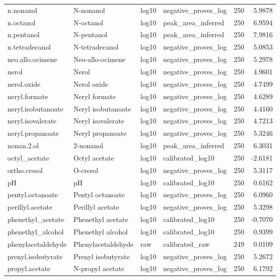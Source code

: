 {\begin{longtable}{llllrr}
n.nonanol & N-nonanol & log10 & negative\_proves\_log & 250 & 5.9878 \\
n.octanol & N-octanol & log10 & peak\_area\_inferred & 250 & 6.9594 \\
n.pentanol & N-pentanol & log10 & peak\_area\_inferred & 250 & 7.9816 \\
n.tetradecanol & N-tetradecanol & log10 & negative\_proves\_log & 250 & 5.0853 \\
neo.allo.ocimene & Neo-allo-ocimene & log10 & negative\_proves\_log & 250 & 5.2978 \\
nerol & Nerol & log10 & negative\_proves\_log & 250 & 4.9601 \\
nerol.oxide & Nerol oxide & log10 & negative\_proves\_log & 250 & 4.7499 \\
neryl.formate & Neryl formate & log10 & negative\_proves\_log & 250 & 4.6289 \\
neryl.isobutanoate & Neryl isobutanoate & log10 & negative\_proves\_log & 250 & 4.4160 \\
neryl.isovalerate & Neryl isovalerate & log10 & negative\_proves\_log & 250 & 4.7213 \\
neryl.propanoate & Neryl propanoate & log10 & negative\_proves\_log & 250 & 5.3246 \\
nonan.2.ol & 2-nonanol & log10 & peak\_area\_inferred & 250 & 6.3031 \\
octyl\_acetate & Octyl acetate & log10 & calibrated\_log10 & 250 & -2.6181 \\
ortho.cresol & O-cresol & log10 & negative\_proves\_log & 250 & 5.3117 \\
pH & pH & log10 & calibrated\_log10 & 250 & 0.6162 \\
pentyl.octanoate & Pentyl octanoate & log10 & negative\_proves\_log & 250 & 6.0960 \\
perillyl.acetate & Perillyl acetate & log10 & negative\_proves\_log & 250 & 5.3298 \\
phenethyl\_acetate & Phenethyl acetate & log10 & calibrated\_log10 & 250 & -0.7070 \\
phenethyl\_alcohol & Phenethyl alcohol & log10 & calibrated\_log10 & 250 & 0.9399 \\
phenylacetaldehyde & Phenylacetaldehyde & raw & calibrated\_raw & 249 & 0.0109 \\
prenyl.isobutyrate & Prenyl isobutyrate & log10 & negative\_proves\_log & 250 & 5.2672 \\
propyl.acetate & N-propyl acetate & log10 & negative\_proves\_log & 250 & 6.1792 \\

\end{longtable}}
